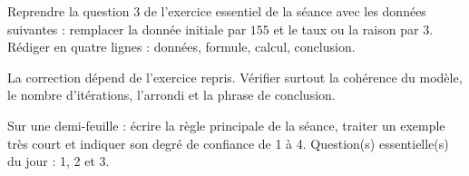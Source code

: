
\begin{homework}Reprendre la question 3 de l'exercice essentiel de la séance avec les données suivantes : remplacer la donnée initiale par $155$ et le taux ou la raison par $3$. Rédiger en quatre lignes : données, formule, calcul, conclusion.\end{homework}
\begin{solution}La correction dépend de l'exercice repris. Vérifier surtout la cohérence du modèle, le nombre d'itérations, l'arrondi et la phrase de conclusion.\end{solution}

\begin{exitticket}[3 minutes]Sur une demi-feuille : écrire la règle principale de la séance, traiter un exemple très court et indiquer son degré de confiance de 1 à 4. Question(s) essentielle(s) du jour : 1, 2 et 3.\end{exitticket}

